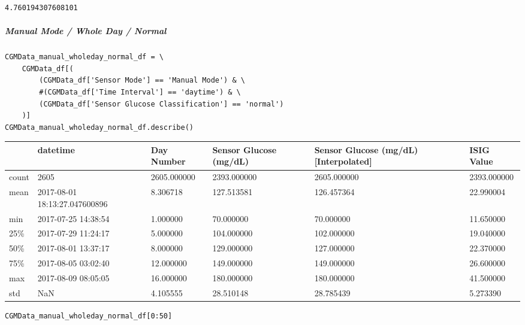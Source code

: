 \begin{verbatim}
4.760194307608101
\end{verbatim}

\subparagraph{Manual Mode / Whole Day / Normal}

\begin{verbatim}
CGMData_manual_wholeday_normal_df = \
    CGMData_df[(
        (CGMData_df['Sensor Mode'] == 'Manual Mode') & \
        #(CGMData_df['Time Interval'] == 'daytime') & \
        (CGMData_df['Sensor Glucose Classification'] == 'normal')
    )]
CGMData_manual_wholeday_normal_df.describe()
\end{verbatim}

\bigskip\noindent
\begin{tabular}{p{}p{}p{}p{}p{}p{}}
\toprule
 & datetime & Day Number & Sensor Glucose (mg/dL) & Sensor Glucose (mg/dL) [Interpolated] & ISIG Value \\
\hline
count & 2605 & 2605.000000 & 2393.000000 & 2605.000000 & 2393.000000 \\
\hline
mean & 2017-08-01 18:13:27.047600896 & 8.306718 & 127.513581 & 126.457364 & 22.990004 \\
\hline
min & 2017-07-25 14:38:54 & 1.000000 & 70.000000 & 70.000000 & 11.650000 \\
\hline
25\% & 2017-07-29 11:24:17 & 5.000000 & 104.000000 & 102.000000 & 19.040000 \\
\hline
50\% & 2017-08-01 13:37:17 & 8.000000 & 129.000000 & 127.000000 & 22.370000 \\
\hline
75\% & 2017-08-05 03:02:40 & 12.000000 & 149.000000 & 149.000000 & 26.600000 \\
\hline
max & 2017-08-09 08:05:05 & 16.000000 & 180.000000 & 180.000000 & 41.500000 \\
\hline
std & NaN & 4.105555 & 28.510148 & 28.785439 & 5.273390 \\
\hline
\bottomrule
\end{tabular}

\bigskip

\begin{verbatim}
CGMData_manual_wholeday_normal_df[0:50]
\end{verbatim}

